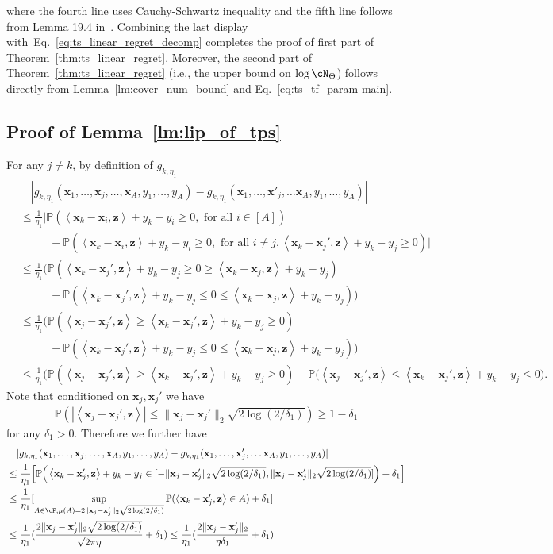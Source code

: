 \documentclass[10pt]{article}
\newcommand{\<}{\left\langle}
\renewcommand{\>}{\right\rangle}
\renewcommand{\P}{\mathbb{P}}
\newcommand{\trunprob}{{\eta_1}}
\newcommand{\Trunregp}{{\eta}}
\newcommand{\tfparspace}{{\Theta}}
\def\bx{{\mathbf x}}
\def\bz{{\mathbf z}}
\begin{document}
where the  fourth line uses  Cauchy-Schwartz inequality and the fifth line follows from Lemma 19.4 in~\cite{lattimore2020bandit}. Combining the last display with~Eq.~\eqref{eq:ts_linear_regret_decomp} completes the proof of first part of Theorem~\ref{thm:ts_linear_regret}. Moreover, the second part of Theorem~\ref{thm:ts_linear_regret}  (i.e., the upper bound on $\log\cN_{\tfparspace}$) follows directly from Lemma~\ref{lm:cover_num_bound} and Eq.~\eqref{eq:ts_tf_param-main}.
\subsection{Proof of Lemma~\ref{lm:lip_of_tps}}\label{sec:pf_lm:lip_of_tps}
For any $j\neq k$, by definition of $g_{k,\trunprob}$
\begin{align*}
     &\quad|g_{k,\trunprob}(\bx_1,\ldots,\bx_j,\ldots,\bx_A,y_1,\ldots,y_A)-g_{k,\trunprob}(\bx_1,\ldots,\bx'_j,\ldots\bx_A,y_1,\ldots,y_A)|
        \\
     &\leq
     \frac{1}{\trunprob}\Big|\P(\<\bx_k-\bx_i,\bz\>+y_k-y_i\geq0,\text{~for all~}i\in[A])\\
     &\qquad~~~ -\P(\<\bx_k-\bx_i,\bz\>+y_k-y_i\geq0,\text{~for all~}i\neq j, \<\bx_k-\bx_j',\bz\>+y_k-y_j\geq0)\Big|
     \\
      &\leq
     \frac{1}{\trunprob}\Big(\P( \<\bx_k-\bx_j',\bz\>+y_k-y_j\geq0\geq\<\bx_k-\bx_j,\bz\>+y_k-y_j )\\
     &\qquad~~~
     +\P( \<\bx_k-\bx_j',\bz\>+y_k-y_j\leq0\leq\<\bx_k-\bx_j,\bz\>+y_k-y_j)\Big)\\
     &\leq
      \frac{1}{\trunprob}\Big(\P(\<\bx_j-\bx_j',\bz\>\geq\<\bx_k-\bx_j',\bz\>+y_k-y_j\geq0 )\\&\qquad~~~+\P( \<\bx_k-\bx_j',\bz\>+y_k-y_j\leq0\leq\<\bx_k-\bx_j,\bz\>+y_k-y_j)\Big)\\
       &\leq
      \frac{1}{\trunprob}\Big(\P(\<\bx_j-\bx_j',\bz\>\geq\<\bx_k-\bx_j',\bz\>+y_k-y_j\geq0 )+\P(\<\bx_j-\bx_j',\bz\>\leq \<\bx_k-\bx_j',\bz\>+y_k-y_j\leq0\Big).
\end{align*}
Note that conditioned on $\bx_j,\bx_j'$ we have
\begin{align*}
    \P(|\<\bx_j-\bx_j',\bz\>|\leq \|\bx_j-\bx_j'\|_2\sqrt{2\log(2/{\delta_1})})\geq 1-{\delta_1}
\end{align*} for any ${\delta_1}>0$. Therefore we further have
\begin{align*}
    &\quad|g_{k,\trunprob}(\bx_1,\ldots,\bx_j,\ldots,\bx_A,y_1,\ldots,y_A)-g_{k,\trunprob}(\bx_1,\ldots,\bx'_j,\ldots\bx_A,y_1,\ldots,y_A)|
    \\
    &\leq
     \frac{1}{\trunprob}\Big[\P\Big(\<\bx_k-\bx_j',\bz\>+y_k-y_j\in[-\|\bx_j-\bx_j'\|_2\sqrt{2\log(2/{\delta_1})},\|\bx_j-\bx_j'\|_2\sqrt{2\log(2/{\delta_1})}] \Big)+{\delta_1}\Big]\\
     &\leq
    \frac{1}{\trunprob}[\sup_{A\in\cF,\mu(A)=2\|\bx_j-\bx_j'\|_2\sqrt{2\log(2/{\delta_1})}}\P(\<\bx_k-\bx_j',\bz\>\in A)+{\delta_1}]\\
    &\leq
   \frac{1}{\trunprob}(\frac{2\|\bx_j-\bx_j'\|_2\sqrt{2\log(2/{\delta_1})}}{\sqrt{2\pi}\Trunregp}+{\delta_1})\leq \frac{1}{\trunprob}(\frac{2\|\bx_j-\bx_j'\|_2}{\Trunregp{\delta_1}}+{\delta_1})
\end{align*}
\end{document}
